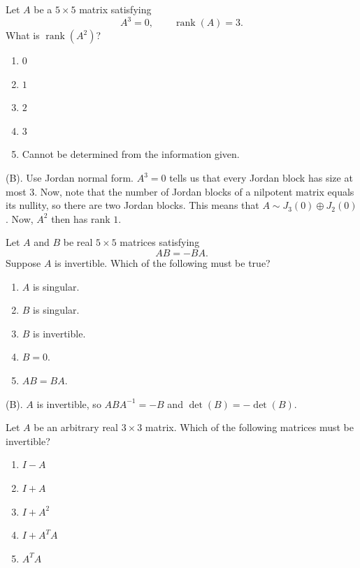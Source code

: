 \begin{exercise}
Let $A$ be a $5\times5$ matrix satisfying
\[
A^3=0,\qquad \operatorname{rank}(A)=3.
\]
What is $\operatorname{rank}(A^2)$?
\begin{enumerate}[label=(\Alph*)]
    \item $0$
    \item $1$
    \item $2$
    \item $3$
    \item Cannot be determined from the information given.
\end{enumerate}
\end{exercise}
\begin{solution}
(B). Use Jordan normal form. $A^3 = 0$ tells us that every Jordan block 
has size at most $3$. Now, note that the number of Jordan blocks of a 
nilpotent matrix equals its nullity, so there are two Jordan blocks. 
This means that $A \sim J_3(0) \oplus J_2(0)$. Now, $A^2$ then has rank $1$.
\end{solution}

\begin{exercise}
Let $A$ and $B$ be real $5\times5$ matrices
satisfying
\[
AB=-BA.
\]
Suppose $A$ is invertible. Which of the following must be true?
\begin{enumerate}[label=(\Alph*)]
    \item $A$ is singular.
    \item $B$ is singular.
    \item $B$ is invertible.
    \item $B=0$.
    \item $AB=BA$.
\end{enumerate}
\end{exercise}
\begin{solution}
(B). $A$ is invertible, so $ABA^{-1} = -B$ and $\det(B) = -\det(B)$.
\end{solution}

\begin{exercise}
Let $A$ be an arbitrary real $3\times3$ matrix. 
Which of the following matrices must be invertible?
\begin{enumerate}[label=(\Alph*)]
    \item $I-A$
    \item $I+A$
    \item $I+A^2$
    \item $I+A^TA$
    \item $A^TA$
\end{enumerate}
\end{exercise}

